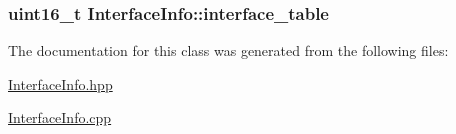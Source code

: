 \subsubsection[{\texorpdfstring{interface\+\_\+table}{interface_table}}]{\setlength{\rightskip}{0pt plus 5cm}uint16\+\_\+t Interface\+Info\+::interface\+\_\+table}\hypertarget{class_interface_info_a5f6c0c20f598a2e8d000a9513776099c}{}\label{class_interface_info_a5f6c0c20f598a2e8d000a9513776099c}


The documentation for this class was generated from the following files\+:\begin{DoxyCompactItemize}
\item 
\hyperlink{_interface_info_8hpp}{Interface\+Info.\+hpp}\item 
\hyperlink{_interface_info_8cpp}{Interface\+Info.\+cpp}\end{DoxyCompactItemize}
